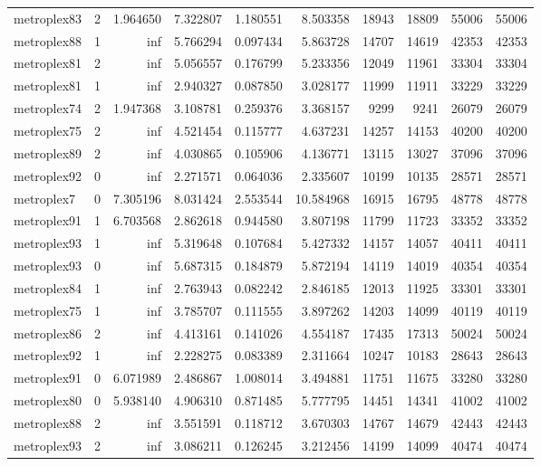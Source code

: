 \begin{longtable}{|l|r|r|r|r|r|r|r|r|r|}
metroplex83 & 2 & 1.964650 & 7.322807 & 1.180551 & 8.503358 & 18943 & 18809 & 55006 & 55006 \\
metroplex88 & 1 & inf & 5.766294 & 0.097434 & 5.863728 & 14707 & 14619 & 42353 & 42353 \\
metroplex81 & 2 & inf & 5.056557 & 0.176799 & 5.233356 & 12049 & 11961 & 33304 & 33304 \\
metroplex81 & 1 & inf & 2.940327 & 0.087850 & 3.028177 & 11999 & 11911 & 33229 & 33229 \\
metroplex74 & 2 & 1.947368 & 3.108781 & 0.259376 & 3.368157 & 9299 & 9241 & 26079 & 26079 \\
metroplex75 & 2 & inf & 4.521454 & 0.115777 & 4.637231 & 14257 & 14153 & 40200 & 40200 \\
metroplex89 & 2 & inf & 4.030865 & 0.105906 & 4.136771 & 13115 & 13027 & 37096 & 37096 \\
metroplex92 & 0 & inf & 2.271571 & 0.064036 & 2.335607 & 10199 & 10135 & 28571 & 28571 \\
metroplex7 & 0 & 7.305196 & 8.031424 & 2.553544 & 10.584968 & 16915 & 16795 & 48778 & 48778 \\
metroplex91 & 1 & 6.703568 & 2.862618 & 0.944580 & 3.807198 & 11799 & 11723 & 33352 & 33352 \\
metroplex93 & 1 & inf & 5.319648 & 0.107684 & 5.427332 & 14157 & 14057 & 40411 & 40411 \\
metroplex93 & 0 & inf & 5.687315 & 0.184879 & 5.872194 & 14119 & 14019 & 40354 & 40354 \\
metroplex84 & 1 & inf & 2.763943 & 0.082242 & 2.846185 & 12013 & 11925 & 33301 & 33301 \\
metroplex75 & 1 & inf & 3.785707 & 0.111555 & 3.897262 & 14203 & 14099 & 40119 & 40119 \\
metroplex86 & 2 & inf & 4.413161 & 0.141026 & 4.554187 & 17435 & 17313 & 50024 & 50024 \\
metroplex92 & 1 & inf & 2.228275 & 0.083389 & 2.311664 & 10247 & 10183 & 28643 & 28643 \\
metroplex91 & 0 & 6.071989 & 2.486867 & 1.008014 & 3.494881 & 11751 & 11675 & 33280 & 33280 \\
metroplex80 & 0 & 5.938140 & 4.906310 & 0.871485 & 5.777795 & 14451 & 14341 & 41002 & 41002 \\
metroplex88 & 2 & inf & 3.551591 & 0.118712 & 3.670303 & 14767 & 14679 & 42443 & 42443 \\
metroplex93 & 2 & inf & 3.086211 & 0.126245 & 3.212456 & 14199 & 14099 & 40474 & 40474 \\

\end{longtable}
